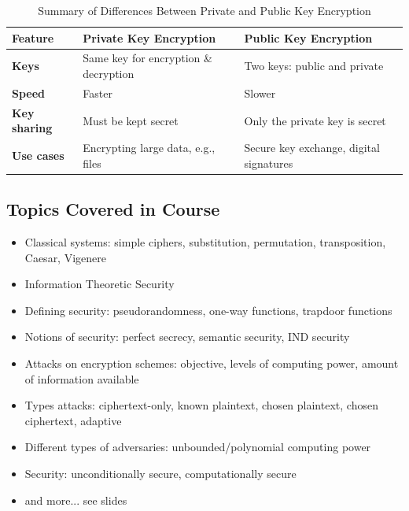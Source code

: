 \begin{table}[h!]
    \centering
    \begin{tabular}{|l|l|l|}
    \hline
    \textbf{Feature}        & \textbf{Private Key Encryption}        & \textbf{Public Key Encryption}         \\ \hline
    \textbf{Keys}           & Same key for encryption \& decryption  & Two keys: public and private           \\ \hline
    \textbf{Speed}          & Faster                                 & Slower                                 \\ \hline
    \textbf{Key sharing}    & Must be kept secret                    & Only the private key is secret         \\ \hline
    \textbf{Use cases}      & Encrypting large data, e.g., files     & Secure key exchange, digital signatures \\ \hline
    \end{tabular}
    \caption{Summary of Differences Between Private and Public Key Encryption}
    \label{tab:encryption_comparison}
    \end{table}
    
\subsection{Topics Covered in Course}
\begin{itemize}
\item Classical systems: simple ciphers, substitution, permutation, transposition, Caesar, Vigenere
\item Information Theoretic Security
\item Defining security: pseudorandomness, one-way functions, trapdoor functions
\item Notions of security: perfect secrecy, semantic security, IND security
\item Attacks on encryption schemes: objective, levels of computing power, amount of information available
\item Types attacks: ciphertext-only, known plaintext, chosen plaintext, chosen ciphertext, adaptive
\item Different types of adversaries: unbounded/polynomial computing power
\item Security: unconditionally secure, computationally secure
\item and more... see slides
\end{itemize}
